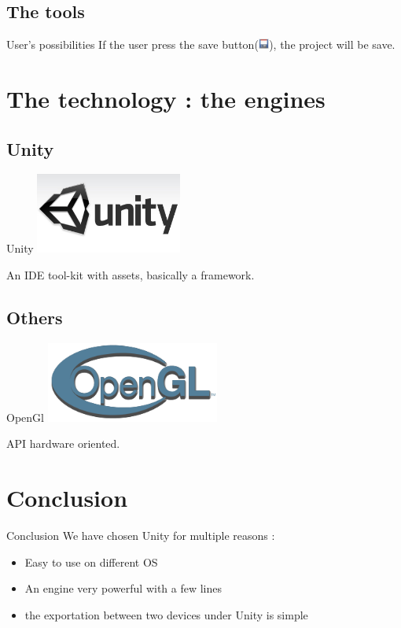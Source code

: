 \documentclass[a4paper,10pt]{beamer}
\begin{document}
		\subsection{The tools}
		
			\begin{frame}{User's possibilities}
				If the user press the save button(\includegraphics[height=10pt]{images/saveIcone.png}), the project will be save.
			\end{frame}
	
	\section{The technology : the engines}
	
		\subsection{Unity}
		
			\begin{frame}{Unity}
				\includegraphics[height=75pt]{images/Logo_Unity.jpg}
				
				 An IDE tool-kit with assets, basically a framework. 
			\end{frame}
			
		\subsection{Others}
			
			\begin{frame}{OpenGl}
				\includegraphics[height=75pt]{images/OpenGL_logo.png}
				
				API hardware oriented.
			\end{frame}
			
	\section{Conclusion}
		
		\begin{frame}{Conclusion}
			We have chosen Unity for multiple reasons :
			\begin{itemize}
				\item Easy to use on different OS
				\item An engine very powerful with a few lines
				\item the exportation between two devices under Unity is simple
			\end{itemize}			
		\end{frame}
	
\end{document}
